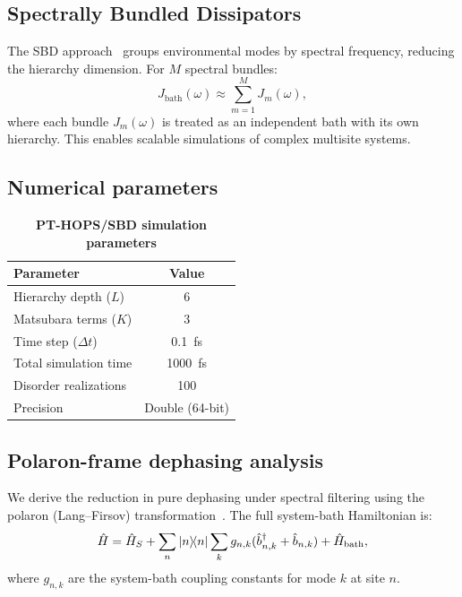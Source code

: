 \documentclass[11pt,a4paper]{article}
\begin{document}
\subsection{Spectrally Bundled Dissipators}

The SBD approach~\cite{Varvelo2021a} groups environmental modes by spectral frequency, reducing the hierarchy dimension. For $M$ spectral bundles:
\begin{equation}
J_{\mathrm{bath}}(\omega) \approx \sum_{m=1}^{M} J_m(\omega),
\label{eq:SI_sbd}
\end{equation}
where each bundle $J_m(\omega)$ is treated as an independent bath with its own hierarchy. This enables scalable simulations of complex multisite systems.

\subsection{Numerical parameters}

\begin{table}[h]
\centering
\caption{\textbf{PT-HOPS/SBD simulation parameters}}
\label{tab:SI_parameters}
\begin{tabular}{lc}
\toprule
\textbf{Parameter} & \textbf{Value} \\
\midrule
Hierarchy depth ($L$) & 6 \\
Matsubara terms ($K$) & 3 \\
Time step ($\Delta t$) & \SI{0.1}{\femto\second} \\
Total simulation time & \SI{1000}{\femto\second} \\
Disorder realizations & 100 \\
Precision & Double (64-bit) \\
\bottomrule
\end{tabular}
\end{table}

\subsection{Polaron-frame dephasing analysis}
\label{sec:polaron_dephasing}

We derive the reduction in pure dephasing under spectral filtering using the polaron (Lang--Firsov) transformation~\cite{Huelga2013,Chin2011}. The full system-bath Hamiltonian is:
\begin{equation}
\hat{H} = \hat{H}_S + \sum_n \dyad{n} \sum_k g_{n,k}(\hat{b}_{n,k}^\dagger + \hat{b}_{n,k}) + \hat{H}_{\mathrm{bath}},
\label{eq:SI_full_hamiltonian}
\end{equation}
where $g_{n,k}$ are the system-bath coupling constants for mode $k$ at site $n$.
\end{document}
